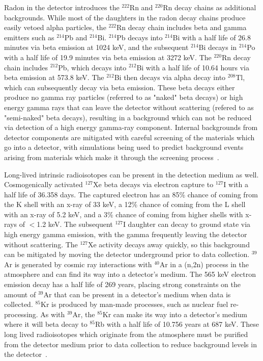 Radon in the detector introduces the $^{222}$Rn and $^{220}$Rn decay chains as additional backgrounds. While most of the daughters in the radon decay chains produce easily vetoed alpha particles, the $^{222}$Rn decay chain includes beta and gamma emitters such as $^{214}$Pb and $^{214}$Bi.  $^{214}$Pb decays into $^{214}$Bi with a half life of 26.8 minutes via beta emission at 1024 keV, and the subsequent $^{214}$Bi decays in $^{214}$Po with a half life of 19.9 minutes via beta emission at 3272 keV.  The $^{220}$Rn decay chain includes $^{212}$Pb, which decays into $^{212}$Bi with a half life of 10.64 hours via beta emission at 573.8 keV.  The $^{212}$Bi then decays via alpha decay into $^{208}$Tl, which can subsequently decay via beta emission.  These beta decays either produce no gamma ray particles (referred to as "naked" beta decays) or high energy gamma rays that can leave the detector without scattering (refered to as "semi-naked" beta decays), resulting in a background which can not be reduced via detection of a high energy gamma-ray component.  Internal backgrounds from detector components are mitigated with careful screening of the materials which go into a detector, with simulations being used to predict background events arising from materials which make it through the screening process~\cite{PauloThesis}.
	 	
Long-lived intrinsic radioisotopes can be present in the detection medium as well.  Cosmogenically activated $^{127}$Xe beta decays via electron capture to $^{127}$I with a half life of 36.358 days.  The captured electron has an 85\% chance of coming from the K shell with an x-ray of 33 keV, a 12\% chance of coming from the L shell with an x-ray of 5.2 keV, and a 3\% chance of coming from higher shells with x-rays of $<$1.2 keV. The subsequent $^{127}$I daughter can decay to ground state via high energy gamma emission, with the gamma frequently leaving the detector without scattering. The $^{127}$Xe activity decays away quickly, so this background can be mitigated by moving the detector underground prior to data collection. $^{39}$Ar is generated by cosmic ray interactions with $^{40}$Ar in a (n,2n) process in the atmosphere and can find its way into a detector's medium.  The 565 keV electron emission decay has a half life of 269 years, placing strong constraints on the amount of $^{39}$Ar that can be present in a detector's medium when data is collected. $^{85}$Kr is produced by man-made processes, such as nuclear fuel re-processing.  As with $^{39}$Ar, the $^{85}$Kr can make its way into a detector's medium where it will beta decay to $^{85}$Rb with a half life of 10.756 years at 687 keV.  These long lived radioisotopes which originate from the atmosphere must be purified from the detector medium prior to data collection to reduce background levels in the detector~\cite{PauloThesis}.

